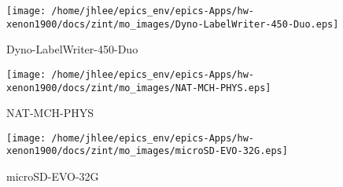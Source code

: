 \noindent
\vspace{1.4cm}
\begin{minipage}{.2\textwidth}
\begin{center}
\texttt{[image: /home/jhlee/epics\_env/epics-Apps/hw-xenon1900/docs/zint/mo\_images/Dyno-LabelWriter-450-Duo.eps]}
\end{center}
\end{minipage}
\begin{minipage}{.7\textwidth}
Dyno-LabelWriter-450-Duo
\end{minipage}


\noindent
\vspace{1.4cm}
\begin{minipage}{.2\textwidth}
\begin{center}
\texttt{[image: /home/jhlee/epics\_env/epics-Apps/hw-xenon1900/docs/zint/mo\_images/NAT-MCH-PHYS.eps]}
\end{center}
\end{minipage}
\begin{minipage}{.7\textwidth}
NAT-MCH-PHYS
\end{minipage}


\noindent
\vspace{1.4cm}
\begin{minipage}{.2\textwidth}
\begin{center}
\texttt{[image: /home/jhlee/epics\_env/epics-Apps/hw-xenon1900/docs/zint/mo\_images/microSD-EVO-32G.eps]}
\end{center}
\end{minipage}
\begin{minipage}{.7\textwidth}
microSD-EVO-32G
\end{minipage}


